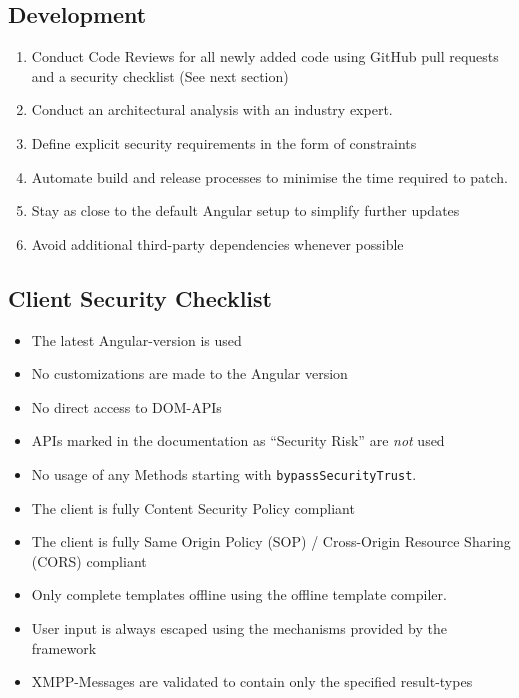 \subsection{Development}

\begin{enumerate}
    \item Conduct Code Reviews for all newly added code using GitHub pull requests and a security checklist (See next section)
    \item Conduct an architectural analysis with an industry expert.
    \item Define explicit security requirements in the form of constraints
    \item Automate build and release processes to minimise the time required to patch.
    \item Stay as close to the default Angular setup to simplify further updates
    \item Avoid additional third-party dependencies whenever possible
\end{enumerate}

\subsection{Client Security Checklist}
\begin{itemize}
    \item The latest Angular-version is used
    \item No customizations are made to the Angular version
    \item No direct access to DOM-APIs
    \item APIs marked in the documentation as ``Security Risk'' are \emph{not} used
    \item No usage of any Methods starting with \texttt{bypassSecurityTrust}.
    \item The client is fully Content Security Policy compliant
    \item The client is fully Same Origin Policy (SOP) / Cross-Origin Resource Sharing (CORS) compliant
    \item Only complete templates offline using the offline template compiler.
    \item User input is always escaped using the mechanisms provided by the framework
    \item XMPP-Messages are validated to contain only the specified result-types
\end{itemize}